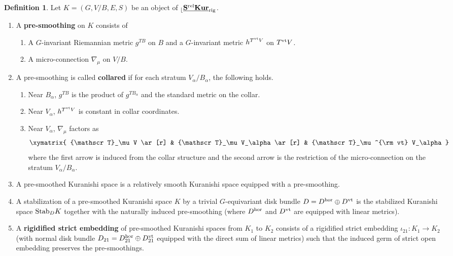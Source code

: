 \documentclass[reqno, 10pt]{amsart}
\numberwithin{equation}{section}
\numberwithin{equation}{section}
\theoremstyle{definition}
\newtheorem{defn}[thm]{Definition}
\theoremstyle{remark}
\newcommand{\beqn}{\begin{equation*}}
\newcommand{\eeqn}{\end{equation*}}
\newcommand{\ms}{\mathscr}
\renewcommand{\outer}{{}_{\lfloor}}
\newcommand{\uds}[1]{\underline{\smash{#1}}}
\begin{document}
\begin{defn}\label{defn:pre-smoothing}
Let $K = (G, V/B, E, S)$ be an object of $\outer \uds{\bf S^{\rm rel} Kur}_{\rm rig}$. 
\begin{enumerate}

\item A {\bf pre-smoothing} on $K$ consists of 
\begin{enumerate}

\item A $G$-invariant Riemannian metric $g^{TB}$ on $B$ and a $G$-invariant metric $h^{T^{\rm vt} V}$ on $T^{\rm vt} V$.

\item A micro-connection $\nabla_\mu$ on $V/B$.
\end{enumerate}

\item A pre-smoothing is called {\bf collared} if for each stratum $V_\alpha/B_\alpha$, the following holds.
\begin{enumerate}
    \item Near $B_\alpha$, $g^{TB}$ is the product of $g^{TB_\alpha}$ and the standard metric on the collar.

    \item Near $V_\alpha$, $h^{T^{\rm vt} V}$ is constant in collar coordinates.

    \item Near $V_\alpha$, $\nabla_\mu$ factors as 
    \beqn
    \xymatrix{ {\ms T}_\mu V \ar[r] & {\ms T}_\mu V_\alpha \ar[r] & {\ms T}_\mu^{\rm vt} V_\alpha}
    \eeqn
    where the first arrow is induced from the collar structure and the second arrow is the restriction of the micro-connection on the stratum $V_\alpha/B_\alpha$.
\end{enumerate}

\item A pre-smoothed Kuranishi space is a relatively smooth Kuranishi space equipped with a pre-smoothing.

\item A stabilization of a pre-smoothed Kuranishi space $K$ by a trivial $G$-equivariant disk bundle $D = D^{\rm hor} \oplus D^{\rm vt}$ is the stabilized Kuranishi space ${\rm Stab}_D K$ together with the naturally induced pre-smoothing (where $D^{\rm hor}$ and $D^{\rm vt}$ are equipped with linear metrics).

\item A {\bf rigidified strict embedding} of pre-smoothed Kuranishi spaces from $K_1$ to $K_2$ consists of a rigidified strict embedding $\iota_{21}: K_1 \to K_2$ (with normal disk bundle $D_{21} = D_{21}^{\rm hor} \oplus D_{21}^{\rm vt}$ equipped with the direct sum of linear metrics) such that the induced germ of strict open embedding preserves the pre-smoothings.


\end{enumerate}
\end{defn}
\end{document}
